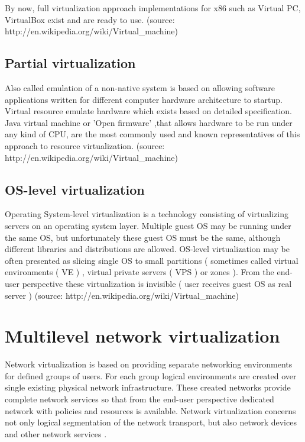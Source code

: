 \documentclass[11pt]{book}
\begin{document}
	By now, full virtualization approach implementations for x86 such as Virtual PC, VirtualBox exist and are ready to 
	use.  (source: http://en.wikipedia.org/wiki/Virtual\_machine)

      \subsection{Partial virtualization}

	Also called emulation of a non-native system is based on allowing software applications written for different computer 
	hardware architecture to startup. Virtual resource emulate hardware which exists based on detailed specification. 
	Java virtual machine or 'Open firmware' ,that allows hardware to be run under any kind of CPU, are the most commonly
	used and known representatives of this approach to resource virtualization. (source: http://en.wikipedia.org/wiki/Virtual\_machine)

      \subsection{OS-level virtualization}

	Operating System-level virtualization is a technology consisting of virtualizing servers on an operating system layer. 
	Multiple guest OS may be running under the same OS, but unfortunately these guest OS must be the same, although
	different libraries and distributions are allowed. OS-level virtualization may be often presented as slicing single OS to small partitions ( 
	sometimes called virtual environments ( VE ) , virtual private servers ( VPS )  or zones ). From the end-user perspective these virtualization
	is invisible ( user receives guest OS as real server ) (source: http://en.wikipedia.org/wiki/Virtual\_machine)


    \section{Multilevel network virtualization}
    \label{sec:ctx:multi}

      Network virtualization is based on providing separate networking environments for defined groups of users. For
      each group logical environments are created over single existing physical network infrastructure. These created
      networks provide complete network services so that from the end-user perspective dedicated network with policies
      and resources is available. Network virtualization concerns not only logical segmentation of the network
      transport, but also network devices and other network services \cite{network_virt}.
\end{document}
